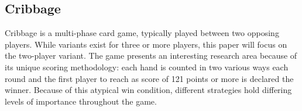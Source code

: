 

\subsection{Cribbage}

Cribbage is a multi-phase card game, typically played between two opposing
players.
%
While variants exist for three or more players, this paper will focus on the
two-player variant.
%
The game presents an interesting research area because of its unique scoring
methodology:
each hand is counted in two various ways each round and the first player to
reach as score of 121 points or more is declared the winner.
%
Because of this atypical win condition, different strategies hold differing
levels of importance throughout the game.




